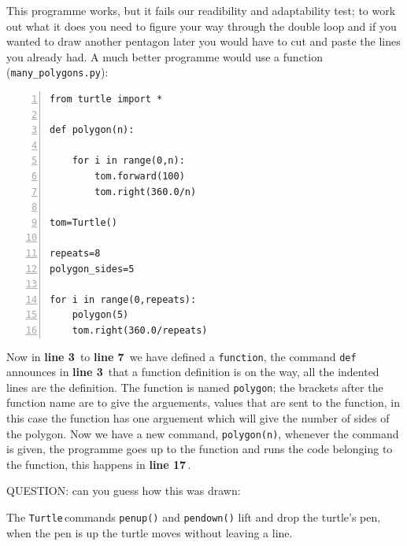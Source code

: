\documentclass[11pt,a4paper]{scrartcl}
\newcommand{\turtle}{\texttt{Turtle}\,}
\newcommand{\lnn}[1]{\textbf{line #1}\,}
\begin{document}
This programme works, but it fails our readibility and adaptability
test; to work out what it does you need to figure your way through the
double loop and if you wanted to draw another pentagon later you would
have to cut and paste the lines you already had. A much better
programme would use a function (\texttt{many\_polygons.py}):
\begin{lstlisting}[numbers=left]
from turtle import *

def polygon(n):

    for i in range(0,n):
        tom.forward(100)
        tom.right(360.0/n)

tom=Turtle()

repeats=8
polygon_sides=5

for i in range(0,repeats):
    polygon(5)
    tom.right(360.0/repeats)
\end{lstlisting}
Now in \lnn{3} to \lnn{7} we have defined a \texttt{function}, the
command \texttt{def} announces in \lnn{3} that a function definition
is on the way, all the indented lines are the definition. The function
is named \texttt{polygon}; the brackets after the function name are to
give the arguements, values that are sent to the function, in this
case the function has one arguement which will give the number of
sides of the polygon. Now we have a new command, \texttt{polygon(n)},
whenever the command is given, the programme goes up to the function
and runs the code belonging to the function, this happens in \lnn{17}.

QUESTION: can you guess how this was drawn:
\begin{center}
\end{center}
The \turtle commands \texttt{penup()} and \texttt{pendown()} lift and
drop the turtle's pen, when the pen is up the turtle moves without
leaving a line.
\end{document}
